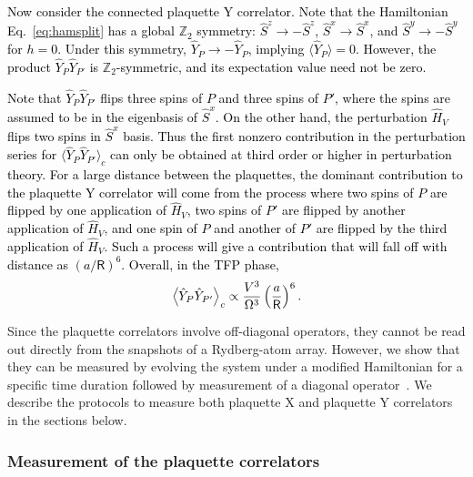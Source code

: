 \documentclass[twocolumn,superscriptaddress,amsmath,amssymb,aps,prx,nofootinbib]{revtex4-2}
\newcommand{\newtext}[1]{\textcolor{black}{#1}}
\begin{document}
\newtext{Now consider the connected plaquette Y correlator. 
Note that the Hamiltonian Eq.~\eqref{eq:hamsplit} has a global $\mathbb{Z}_2$ symmetry: $\hat{S}^z \rightarrow -\hat{S}^z$, $\hat{S}^x \rightarrow \hat{S}^x$, and $\hat{S}^y \rightarrow -\hat{S}^y$ for $h=0$. Under this symmetry, $\hat{Y}_P \rightarrow -\hat{Y}_P$, implying  $\langle \hat{Y}_P \rangle = 0$. 
However, the product $\hat{Y}_P \hat{Y}_{P'}$ is $\mathbb{Z}_2$-symmetric, and its expectation value need not be zero. }

\newtext{Note that $\hat{Y}_P \hat{Y}_{P'}$ flips three spins of $P$ and three spins of $P'$, where the spins are assumed to be in the eigenbasis of  $\hat{S}^x$. On the other hand, the perturbation $\hat{H}_V$ flips two spins in $\hat{S}^x$ basis. Thus the first nonzero contribution in the perturbation series for $\langle \hat{Y}_P \hat{Y}_{P'} \rangle_c$ can only be obtained at third order or higher in perturbation theory. For a large distance between the plaquettes, the dominant contribution to the plaquette Y correlator will come from the process where two spins of $P$ are flipped by one application of $\hat{H}_V$, two spins of $P'$ are flipped by another application of $\hat{H}_V$, and one spin of $P$ and another of $P'$ are flipped by the third application of $\hat{H}_V$. Such a process will give a contribution that will fall off with distance as $\left(a / \mathsf{R} \right)^6$. Overall, in the TFP phase,
\begin{equation}
    \label{eq:Y_plaq_corr_TFP}
        \expval{ \hat{Y}_P \hat{Y}_{P'} }_{c} \propto \frac{V^3}{\Omega^3 } \left( \frac{a}{\mathsf{R}} \right)^{6}.
\end{equation}}

Since the plaquette correlators involve off-diagonal operators, they cannot be read out directly from the snapshots of a Rydberg-atom array. However, we show  that they can be measured by evolving the system under a modified Hamiltonian for a specific time duration followed by measurement of a diagonal operator~\cite{verresen2021, semeghini2021}. We describe the protocols to measure both plaquette X and plaquette Y correlators in the sections below.\\


\subsubsection{Measurement of the plaquette correlators} \label{sec:xy_plaq_corr}
\end{document}
